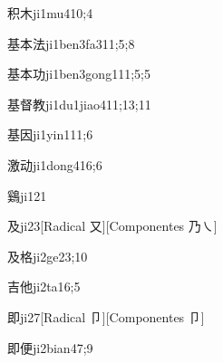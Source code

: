 \begin{verbete}{积木}{ji1mu4}{10;4}
\end{verbete}

\begin{verbete}{基本法}{ji1ben3fa3}{11;5;8}
\end{verbete}

\begin{verbete}{基本功}{ji1ben3gong1}{11;5;5}
\end{verbete}

\begin{verbete}{基督教}{ji1du1jiao4}{11;13;11}
\end{verbete}

\begin{verbete}{基因}{ji1yin1}{11;6}
\end{verbete}

\begin{verbete}{激动}{ji1dong4}{16;6}
\end{verbete}

\begin{verbete}{鷄}{ji1}{21}
\end{verbete}

\begin{verbete}{及}{ji2}{3}[Radical 又][Componentes 乃㇏]
\end{verbete}

\begin{verbete}{及格}{ji2ge2}{3;10}
\end{verbete}

\begin{verbete}{吉他}{ji2ta1}{6;5}
\end{verbete}

\begin{verbete}{即}{ji2}{7}[Radical 卩][Componentes 卩]
\end{verbete}

\begin{verbete}{即便}{ji2bian4}{7;9}
\end{verbete}

